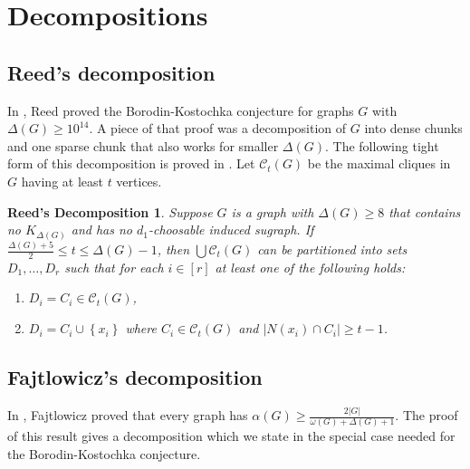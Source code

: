\documentclass[12pt]{article}
\theoremstyle{plain}
\newtheorem*{ReedDecomp}{Reed's Decomposition}
\theoremstyle{definition}
\theoremstyle{remark}
\newcommand{\fancy}[1]{\mathcal{#1}}
\newcommand{\CC}{\fancy{C}}
\newcommand{\set}[1]{\left\{ #1 \right\}}
\newcommand{\card}[1]{\left|#1\right|}
\newcommand{\irange}[1]{\left[#1\right]}
\begin{document}
\section{Decompositions}
\subsection{Reed's decomposition}
In \cite{reed1999strengthening}, Reed proved the Borodin-Kostochka conjecture for graphs $G$ with $\Delta(G) \ge 10^{14}$.  A piece of that proof was a decomposition of $G$
into dense chunks and one sparse chunk that also works for smaller $\Delta(G)$.  The following tight form of this decomposition is proved in \cite{denseneighborhoods}.
Let $\CC_t(G)$ be the maximal cliques in $G$ having at least $t$ vertices.

\begin{ReedDecomp}
Suppose $G$ is a graph with $\Delta(G) \ge 8$ that contains no $K_{\Delta(G)}$ and has no $d_1$-choosable induced sugraph. If
$\frac{\Delta(G) + 5}{2} \le t \le \Delta(G) - 1$, then $\bigcup \CC_t(G)$ can be
partitioned into sets $D_1, \ldots, D_r$ such that for each $i \in \irange{r}$
at least one of the following holds:
\begin{enumerate}
  \item $D_i = C_i \in \CC_t(G)$,
  \item $D_i = C_i \cup \set{x_i}$ where $C_i \in \CC_t(G)$ and $\card{N(x_i) \cap C_i} \geq t-1$.
\end{enumerate}
\end{ReedDecomp}

\subsection{Fajtlowicz's decomposition}
In \cite{fajtlowicz1984independence}, Fajtlowicz proved that every graph has $\alpha(G) \ge \frac{2\card{G}}{\omega(G) + \Delta(G) + 1}$.  The proof of this result
gives a decomposition which we state in the special case needed for the Borodin-Kostochka conjecture.
\end{document}
